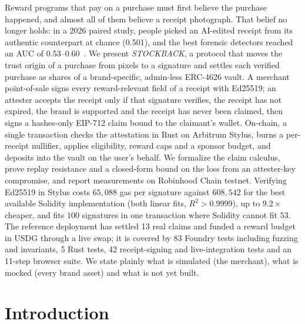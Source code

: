 \documentclass[10.5pt,letterpaper]{article}
\theoremstyle{definition}
\theoremstyle{remark}
\begin{document}
\begin{center}
\begin{minipage}{0.9\textwidth}
\small
{}
Reward programs that pay on a purchase must first believe the purchase happened, and almost all of them
believe a receipt photograph. That belief no longer holds: in a 2026 paired study, people picked an
AI-edited receipt from its authentic counterpart at chance (0.501), and the best forensic detectors reached
an AUC of 0.53--0.60~\cite{wu2026forger}. We present \emph{STOCKBACK}, a protocol that moves the trust origin of a
purchase from pixels to a signature and settles each verified purchase as shares of a brand-specific,
admin-less ERC-4626 vault. A merchant point-of-sale signs every reward-relevant field of a receipt with
Ed25519; an attester accepts the receipt only if that signature verifies, the receipt has not expired, the
brand is supported and the receipt has never been claimed, then signs a hashes-only EIP-712 claim bound to
the claimant's wallet. On-chain, a single transaction checks the attestation in Rust on Arbitrum Stylus,
burns a per-receipt nullifier, applies eligibility, reward caps and a sponsor budget, and deposits into the
vault on the user's behalf. We formalize the claim calculus, prove replay resistance and a closed-form bound
on the loss from an attester-key compromise, and report measurements on Robinhood Chain testnet. Verifying
Ed25519 in Stylus costs $65{,}088$ gas per signature against $608{,}542$ for the best available Solidity
implementation (both linear fits, $R^2>0.9999$), up to $9.2\times$ cheaper, and fits $100$ signatures in one
transaction where Solidity cannot fit $53$. The reference deployment has settled 13 real claims and funded a
reward budget in USDG through a live swap; it is covered
by 83 Foundry tests including fuzzing and invariants, 5 Rust tests, 42 receipt-signing and live-integration
tests and an 11-step browser suite. We state plainly what is simulated (the merchant), what is mocked (every
brand asset) and what is not yet built.
\end{minipage}
\end{center}

\vspace{6pt}

\section{Introduction}
\end{document}
